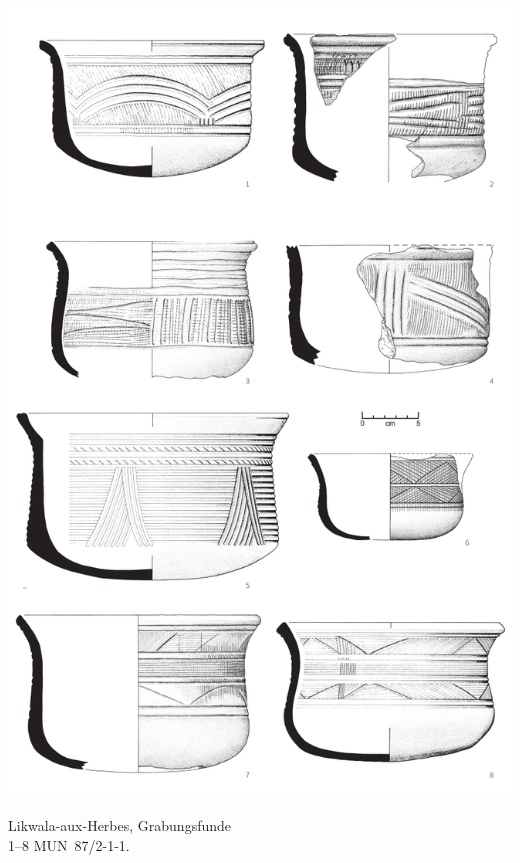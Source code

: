 \begin{pl}[H]
	\includegraphics{plt/Taf91.pdf}
	\vspace{.75em}\caption{Likwala-aux-Herbes, Grabungsfunde \\ 1--8 MUN~87/2-1-1.}
	\label{pl:91}
\end{pl}

